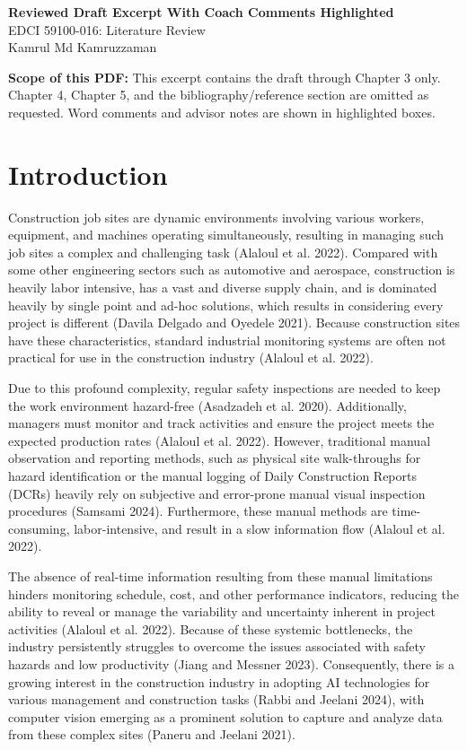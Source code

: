 \documentclass[10pt]{article}
\begin{document}
\begin{center}
{\Large\textbf{Reviewed Draft Excerpt With Coach Comments Highlighted}}\\[0.3em]
EDCI 59100-016: Literature Review\\
Kamrul Md Kamruzzaman\\
\end{center}
\noindent\textbf{Scope of this PDF:} This excerpt contains the draft through Chapter 3 only. Chapter 4, Chapter 5, and the bibliography/reference section are omitted as requested. Word comments and advisor notes are shown in highlighted boxes.

\section*{Introduction}
Construction job sites are dynamic environments involving various workers, equipment, and machines operating simultaneously, resulting in managing such job sites a complex and challenging task (Alaloul et al. 2022). Compared with some other engineering sectors such as automotive and aerospace, construction is heavily labor intensive, has a vast and diverse supply chain, and is dominated heavily by single point and ad-hoc solutions, which results in considering every project is different (Davila Delgado and Oyedele 2021). Because construction sites have these characteristics, standard industrial monitoring systems are often not practical for use in the construction industry (Alaloul et al. 2022).

Due to this profound complexity, regular safety inspections are needed to keep the work environment hazard-free (Asadzadeh et al. 2020). Additionally, managers must monitor and track activities and ensure the project meets the expected production rates (Alaloul et al. 2022). However, traditional manual observation and reporting methods, such as physical site walk-throughs for hazard identification or the manual logging of Daily Construction Reports (DCRs) heavily rely on subjective and error-prone manual visual inspection procedures (Samsami 2024). Furthermore, these manual methods are time-consuming, labor-intensive, and result in a slow information flow (Alaloul et al. 2022).

The absence of real-time information resulting from these manual limitations hinders monitoring schedule, cost, and other performance indicators, reducing the ability to reveal or manage the variability and uncertainty inherent in project activities (Alaloul et al. 2022). Because of these systemic bottlenecks, the industry persistently struggles to overcome the issues associated with safety hazards and low productivity (Jiang and Messner 2023). Consequently, there is a growing interest in the construction industry in adopting AI technologies for various management and construction tasks (Rabbi and Jeelani 2024), with computer vision emerging as a prominent solution to capture and analyze data from these complex sites (Paneru and Jeelani 2021).
\end{document}
